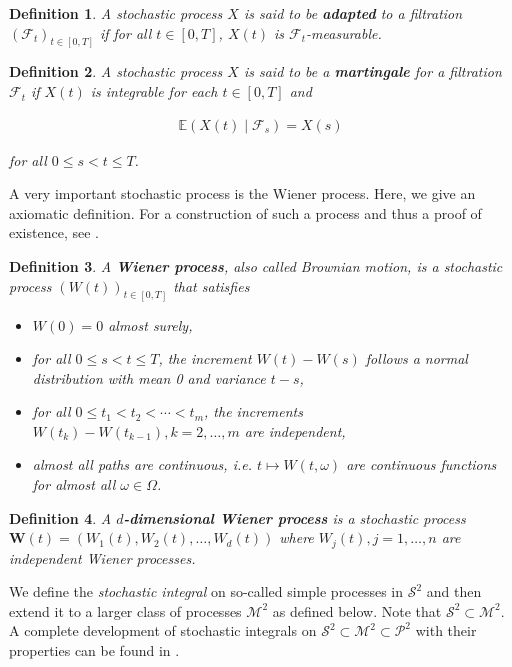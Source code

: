 \documentclass[a4paper]{article}
\newtheorem{definition}{Definition}[section]
\begin{document}
\begin{definition}
  A stochastic process $X$ is said to be \textbf{adapted} to a filtration $(\mathcal{F}_t)_{t \in [0,T]}$ if for all $t \in [0,T]$, $X(t)$ is $\mathcal{F}_t$-measurable.
\end{definition}

\begin{definition}
  A stochastic process $X$ is said to be a \textbf{martingale} for a filtration $\mathcal{F}_t$ if $X(t)$ is integrable for each $t \in [0,T]$ and

  \begin{align*}
    \mathbb{E}(X(t) \mid \mathcal{F}_s) = X(s)
  \end{align*}

  for all $0 \le s < t \le T$.
\end{definition}

A very important stochastic process is the Wiener process. Here, we give an axiomatic definition. For a construction of such a process and thus a proof of existence, see \textcite{capinski_stochastic_2012}.

\begin{definition}
  A \textbf{Wiener process}, also called Brownian motion, is a stochastic process $(W(t))_{t \in [0,T]}$ that satisfies

  \begin{itemize}
    \item $W(0) = 0$ almost surely,
    \item for all $0 \le s < t \le T$, the increment $W(t) - W(s)$ follows a normal distribution with mean 0 and variance $t - s$,
    \item for all $0 \le t_1 < t_2 < \cdots < t_m$, the increments $W(t_k) - W(t_{k-1}), k=2,\ldots,m$ are independent,
    \item almost all paths are continuous, i.e. $t \mapsto W(t,\omega)$ are continuous functions for almost all $\omega \in \Omega$.
  \end{itemize}
\end{definition}

\begin{definition}
  A \textbf{$d$-dimensional Wiener process} is a stochastic process $\mathbf{W}(t) = (W_1(t), W_2(t), \ldots, W_d(t))$ where $W_j(t), j=1,\ldots,n$ are independent Wiener processes.
\end{definition}

We define the \textit{stochastic integral} on so-called simple processes in $\mathcal{S}^2$ and then extend it to a larger class of processes $\mathcal{M}^2$ as defined below. Note that $\mathcal{S}^2 \subset \mathcal{M}^2$. A complete development of stochastic integrals on $\mathcal{S}^2 \subset \mathcal{M}^2 \subset \mathcal{P}^2$ with their properties can be found in \textcite{capinski_stochastic_2012}.
\end{document}
